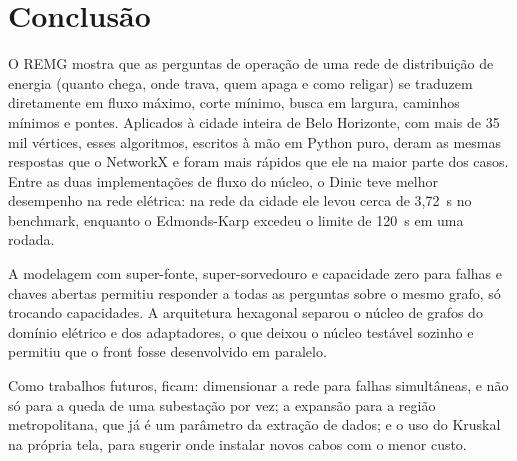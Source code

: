 \documentclass[12pt]{article}
\begin{document}
\section{Conclusão}
\label{sec:conclusao}

O REMG mostra que as perguntas de operação de uma rede de distribuição de energia (quanto chega, onde trava, quem apaga e como religar) se traduzem diretamente em fluxo máximo, corte mínimo, busca em largura, caminhos mínimos e pontes. Aplicados à cidade inteira de Belo Horizonte, com mais de 35 mil vértices, esses algoritmos, escritos à mão em Python puro, deram as mesmas respostas que o NetworkX e foram mais rápidos que ele na maior parte dos casos. Entre as duas implementações de fluxo do núcleo, o Dinic teve melhor desempenho na rede elétrica: na rede da cidade ele levou cerca de 3,72~s no benchmark, enquanto o Edmonds-Karp excedeu o limite de 120~s em uma rodada.

A modelagem com super-fonte, super-sorvedouro e capacidade zero para falhas e chaves abertas permitiu responder a todas as perguntas sobre o mesmo grafo, só trocando capacidades. A arquitetura hexagonal separou o núcleo de grafos do domínio elétrico e dos adaptadores, o que deixou o núcleo testável sozinho e permitiu que o front fosse desenvolvido em paralelo.

Como trabalhos futuros, ficam: dimensionar a rede para falhas simultâneas, e não só para a queda de uma subestação por vez; a expansão para a região metropolitana, que já é um parâmetro da extração de dados; e o uso do Kruskal na própria tela, para sugerir onde instalar novos cabos com o menor custo.



\end{document}
